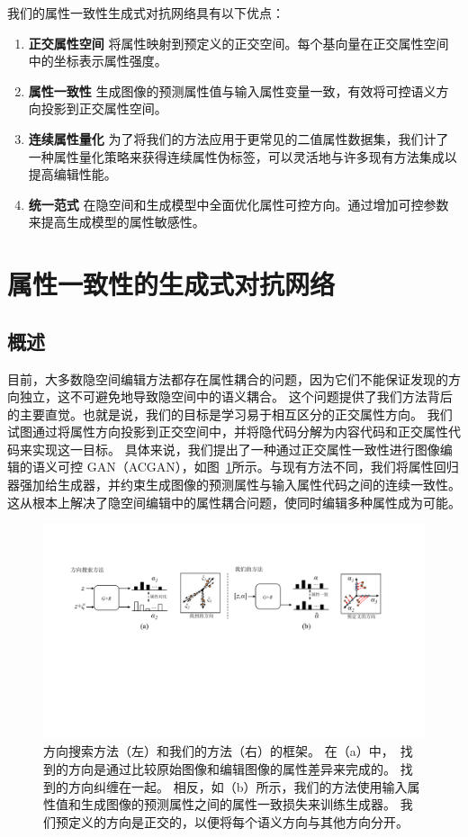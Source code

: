 我们的属性一致性生成式对抗网络具有以下优点：
\begin{enumerate}
    \item \textbf{正交属性空间} 将属性映射到预定义的正交空间。每个基向量在正交属性空间中的坐标表示属性强度。
    \item \textbf{属性一致性} 生成图像的预测属性值与输入属性变量一致，有效将可控语义方向投影到正交属性空间。
    \item \textbf{连续属性量化} 为了将我们的方法应用于更常见的二值属性数据集，我们计了一种属性量化策略来获得连续属性伪标签，可以灵活地与许多现有方法集成以提高编辑性能。
    \item \textbf{统一范式} 在隐空间和生成模型中全面优化属性可控方向。通过增加可控参数来提高生成模型的属性敏感性。
\end{enumerate}

\section{属性一致性的生成式对抗网络}

\subsection{概述}
目前，大多数隐空间编辑方法都存在属性耦合的问题，因为它们不能保证发现的方向独立，这不可避免地导致隐空间中的语义耦合。
这个问题提供了我们方法背后的主要直觉。也就是说，我们的目标是学习易于相互区分的正交属性方向。
我们试图通过将属性方向投影到正交空间中，并将隐代码分解为内容代码和正交属性代码来实现这一目标。
具体来说，我们提出了一种通过正交属性一致性进行图像编辑的语义可控 GAN（ACGAN），如图~\ref{fig:framework}所示。与现有方法不同，我们将属性回归器强加给生成器，并约束生成图像的预测属性与输入属性代码之间的连续一致性。
这从根本上解决了隐空间编辑中的属性耦合问题，使同时编辑多种属性成为可能。

\begin{figure}
    \centering
    \includegraphics[width=1\linewidth]{figures/ACGAN/framework.pdf}
    \caption{方向搜索方法（左）和我们的方法（右）的框架。 在（a）中，~\cite{icml2020, iclr2021}找到的方向是通过比较原始图像和编辑图像的属性差异来完成的。 找到的方向纠缠在一起。 相反，如（b）所示，我们的方法使用输入属性值和生成图像的预测属性之间的属性一致损失来训练生成器。 我们预定义的方向是正交的，以便将每个语义方向与其他方向分开。}
    \label{fig:framework}
  \end{figure}

